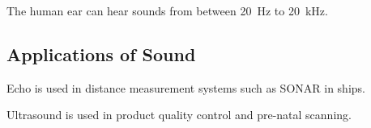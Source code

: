 \documentclass[../main.tex]{subfiles}
\begin{document}
	The human ear can hear sounds from between \SI{20}{\hertz} to \SI{20}{\kilo\hertz}.
	
	\subsection{Applications of Sound}
	Echo is used in distance measurement systems such as SONAR in ships. 
	
	Ultrasound is used in product quality control and pre-natal scanning.
\end{document}
